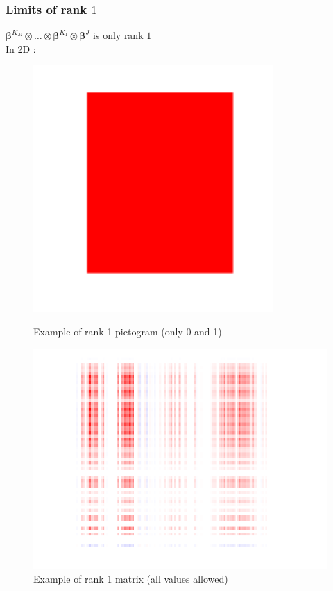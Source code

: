 \documentclass{beamer}
\begin{document}
\begin{frame}
    \frametitle{Limits of rank $1$}
    $\bm{\beta}^{K_M} \otimes \hdots \otimes \bm{\beta}^{K_1} \otimes  \bm{\beta}^{J}$  is only rank $1$\\[10 pt]
    In 2D :
    \begin{figure}
        \centering
        \begin{minipage}{0.3\textwidth}
            \centering
            \includegraphics[width=\textwidth]{images/square.png}
            \caption{\centering Example of rank 1 pictogram (only 0 and 1)}
        \end{minipage}
        \hspace{0.1\textwidth}
        \begin{minipage}{0.4\textwidth}
            \centering
            \includegraphics[width=\textwidth]{images/picto_500/heatmap_logistic_multibloc_simu_500_multiway.png}
            \caption{\centering Example of rank 1 matrix (all values allowed)}
        \end{minipage}
    \end{figure}


\end{frame}
\end{document}
